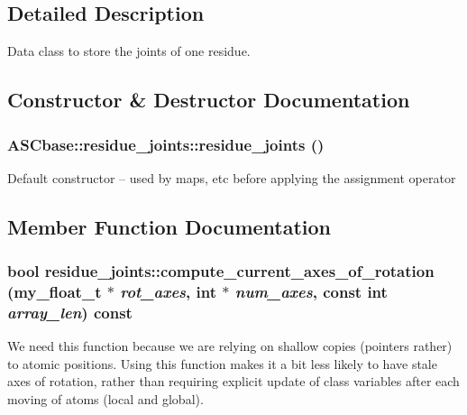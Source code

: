\subsection{Detailed Description}
Data class to store the joints of one residue. 



\subsection{Constructor \& Destructor Documentation}
\subsubsection{\setlength{\rightskip}{0pt plus 5cm}ASCbase::residue\_\-joints::residue\_\-joints ()\hspace{0.3cm}{\tt  [inline]}}\label{classASCbase_1_1residue__joints_1a5a5d456651261c8cfa2f1588f829de}


Default constructor -- used by maps, etc before applying the assignment operator 

\subsection{Member Function Documentation}
\subsubsection{\setlength{\rightskip}{0pt plus 5cm}bool residue\_\-joints::compute\_\-current\_\-axes\_\-of\_\-rotation (my\_\-float\_\-t $\ast$ {\em rot\_\-axes}, int $\ast$ {\em num\_\-axes}, const int {\em array\_\-len}) const}\label{classASCbase_1_1residue__joints_3a4671e36329ec606cfb9b1c91c7b334}


We need this function because we are relying on shallow copies (pointers rather) to atomic positions. Using this function makes it a bit less likely to have stale axes of rotation, rather than requiring explicit update of class variables after each moving of atoms (local and global). 
